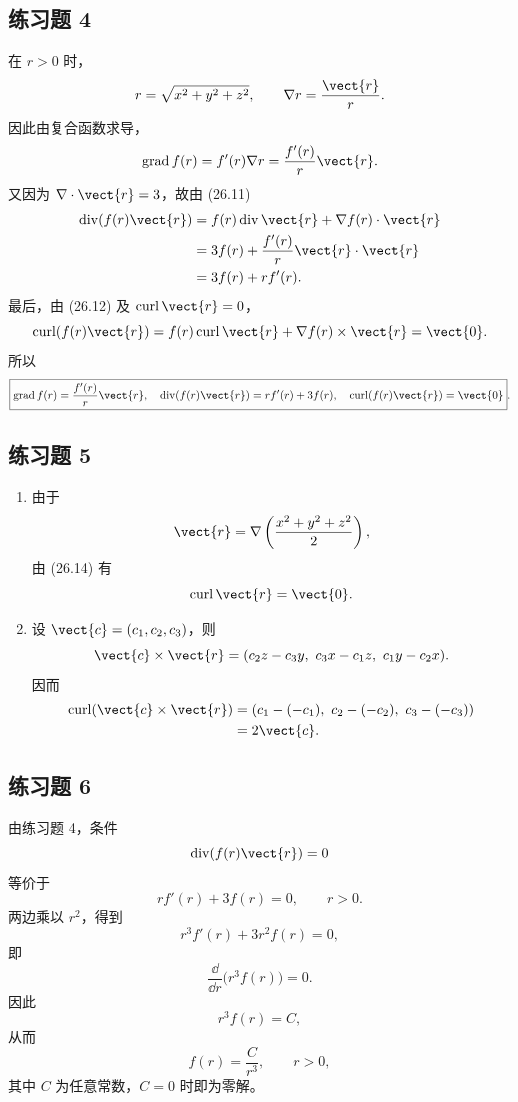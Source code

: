 \subsection*{练习题 4}
\begin{xsolution}
在 $r>0$ 时，
\[
  r=\sqrt{x^2+y^2+z^2},
  \qquad
  \nabla r=\frac{\vect{r}}{r}.
\]
因此由复合函数求导，
\[
  \operatorname{grad}f(r)=f'(r)\nabla r
  =\frac{f'(r)}{r}\vect{r}.
\]
又因为 $\nabla\cdot\vect{r}=3$，故由 (26.11)
\begin{align*}
  \operatorname{div}(f(r)\vect{r})
  &=f(r)\operatorname{div}\vect{r}+\nabla f(r)\cdot\vect{r}\\
  &=3f(r)+\frac{f'(r)}{r}\vect{r}\cdot\vect{r}\\
  &=3f(r)+rf'(r).
\end{align*}
最后，由 (26.12) 及 $\operatorname{curl}\vect{r}=0$，
\[
  \operatorname{curl}(f(r)\vect{r})
  =f(r)\operatorname{curl}\vect{r}+\nabla f(r)\times\vect{r}
  =\vect{0}.
\]
所以
\[
  \boxed{
  \operatorname{grad}f(r)=\frac{f'(r)}{r}\vect{r},\quad
  \operatorname{div}(f(r)\vect{r})=rf'(r)+3f(r),\quad
  \operatorname{curl}(f(r)\vect{r})=\vect{0}
  }.
\]
\end{xsolution}

\subsection*{练习题 5}
\begin{xsolution}
\begin{enumerate}[label=(\arabic*)]
  \item 由于
  \[
    \vect{r}=\nabla\left(\frac{x^2+y^2+z^2}{2}\right),
  \]
  由 (26.14) 有
  \[
    \operatorname{curl}\vect{r}=\vect{0}.
  \]

  \item 设 $\vect{c}=(c_1,c_2,c_3)$，则
  \[
    \vect{c}\times\vect{r}
    =(c_2z-c_3y,\ c_3x-c_1z,\ c_1y-c_2x).
  \]
  因而
  \begin{align*}
    \operatorname{curl}(\vect{c}\times\vect{r})
    &=(c_1-(-c_1),\ c_2-(-c_2),\ c_3-(-c_3))\\
    &=2\vect{c}.
  \end{align*}
\end{enumerate}
\end{xsolution}

\subsection*{练习题 6}
\begin{xsolution}
由练习题 4，条件
\[
  \operatorname{div}(f(r)\vect{r})=0
\]
等价于
\[
  rf'(r)+3f(r)=0,
  \qquad r>0.
\]
两边乘以 $r^2$，得到
\[
  r^3f'(r)+3r^2f(r)=0,
\]
即
\[
  \frac{\dd}{\dd r}\bigl(r^3f(r)\bigr)=0.
\]
因此
\[
  r^3f(r)=C,
\]
从而
\[
  \boxed{f(r)=\frac{C}{r^3}},\qquad r>0,
\]
其中 $C$ 为任意常数，$C=0$ 时即为零解。
\end{xsolution}

